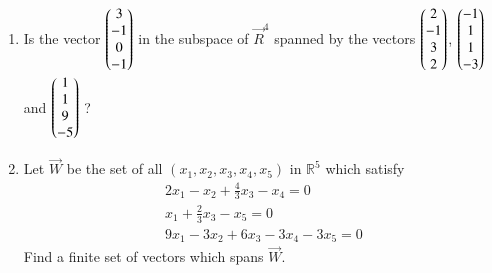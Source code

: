 \begin{enumerate}[label=\thesubsection.\arabic*.,ref=\thesubsection.\theenumi]
\begin{enumerate}
\end{enumerate}
\item Is the vector $\begin{pmatrix}3\\-1\\0\\-1\end{pmatrix}$ in the subspace of $\vec{R}^{4}$ spanned by the vectors $\begin{pmatrix}2\\-1\\3\\2\end{pmatrix}$, $\begin{pmatrix}-1\\1\\1\\-3\end{pmatrix}$ and $\begin{pmatrix}1\\1\\9\\-5\end{pmatrix}$ ?
%
\\
\solution

%
\item  Let $\vec{W}$ be the set of all $(x_1,x_2,x_3,x_4,x_5)$ in $\mathbb{R}^5$ which satisfy
 \begin{align}
 2x_1-x_2+\frac{4}{3}x_3-x_4=0\\x_1+\frac{2}{3}x_3-x_5=0\\9x_1-3x_2+6x_3-3x_4-3x_5=0
 \end{align}
 Find a finite set of vectors which spans $\vec{W}$.


\end{enumerate}
